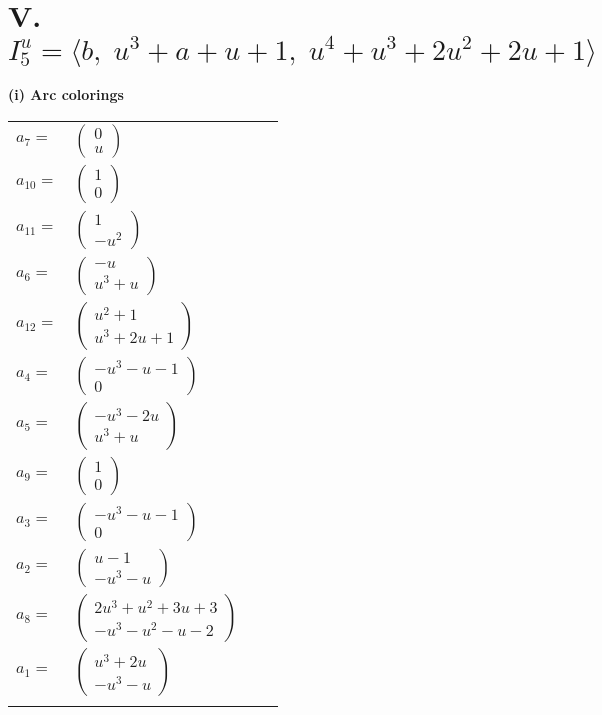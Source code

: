 \documentclass[1p]{elsarticle_modified}
\theoremstyle{definition}
\begin{document}
\centering \section*{V. $I^u_{5}= \langle b,\;u^3+a+u+1,\;u^4+u^3+2 u^2+2 u+1 \rangle$}
\flushleft \textbf{(i) Arc colorings}\\
\begin{tabular}{m{7pt} m{180pt} m{7pt} m{180pt} }
\flushright $a_{7}=$&$\begin{pmatrix}0\\u\end{pmatrix}$ \\
\flushright $a_{10}=$&$\begin{pmatrix}1\\0\end{pmatrix}$ \\
\flushright $a_{11}=$&$\begin{pmatrix}1\\- u^2\end{pmatrix}$ \\
\flushright $a_{6}=$&$\begin{pmatrix}- u\\u^3+u\end{pmatrix}$ \\
\flushright $a_{12}=$&$\begin{pmatrix}u^2+1\\u^3+2 u+1\end{pmatrix}$ \\
\flushright $a_{4}=$&$\begin{pmatrix}- u^3- u-1\\0\end{pmatrix}$ \\
\flushright $a_{5}=$&$\begin{pmatrix}- u^3-2 u\\u^3+u\end{pmatrix}$ \\
\flushright $a_{9}=$&$\begin{pmatrix}1\\0\end{pmatrix}$ \\
\flushright $a_{3}=$&$\begin{pmatrix}- u^3- u-1\\0\end{pmatrix}$ \\
\flushright $a_{2}=$&$\begin{pmatrix}u-1\\- u^3- u\end{pmatrix}$ \\
\flushright $a_{8}=$&$\begin{pmatrix}2 u^3+u^2+3 u+3\\- u^3- u^2- u-2\end{pmatrix}$ \\
\flushright $a_{1}=$&$\begin{pmatrix}u^3+2 u\\- u^3- u\end{pmatrix}$\\&\end{tabular}
\end{document}
